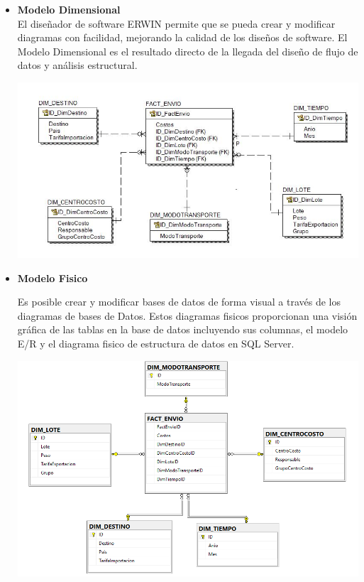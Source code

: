 \begin{itemize}
    \item \textbf{Modelo Dimensional}
\\
El diseñador de software ERWIN permite que se pueda crear y modificar diagramas con facilidad, mejorando la calidad de los diseños de software. El Modelo Dimensional es el resultado directo de la llegada del diseño de flujo de datos y análisis estructural.

	\begin{center}
	\includegraphics[width=17cm]{./Imagenes/Ejercicio1Logico}
	\end{center}	

    \item \textbf{Modelo Fisico}

Es posible crear y modificar bases de datos de forma visual a través de los diagramas de bases de Datos. Estos diagramas fisicos proporcionan una visión gráfica de las tablas en la base de datos incluyendo sus columnas, el modelo E/R y el diagrama fisico de estructura de datos en SQL Server.

	\begin{center}
	\includegraphics[width=17cm]{./Imagenes/Ejercicio1Fisico}
	\end{center}	


\end{itemize}
